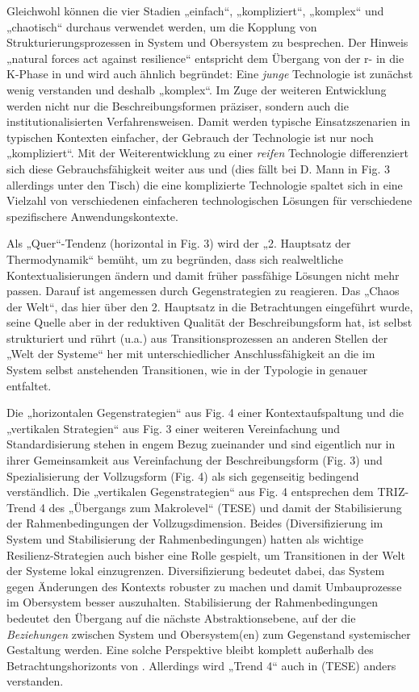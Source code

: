 \documentclass[11pt,a4paper]{article}
\begin{document}
Gleichwohl können die vier Stadien „einfach“, „kompliziert“, „komplex“ und
„chaotisch“ durchaus verwendet werden, um die Kopplung von
Strukturierungsprozessen in System und Obersystem zu besprechen. Der Hinweis
„natural forces act against resilience“ \cite[Fig. 3]{Mann2019} entspricht dem
Übergang von der r- in die K-Phase in \cite{Holling2000} und wird auch ähnlich
begründet: Eine \emph{junge} Technologie ist zunächst wenig verstanden und
deshalb „komplex“. Im Zuge der weiteren Entwicklung werden nicht nur die
Beschreibungsformen präziser, sondern auch die institutionalisierten
Verfahrensweisen. Damit werden typische Einsatzszenarien in typischen
Kontexten einfacher, der Gebrauch der Technologie ist nur noch „kompliziert“.
Mit der Weiterentwicklung zu einer \emph{reifen} Technologie differenziert
sich diese Gebrauchsfähigkeit weiter aus und (dies fällt bei D. Mann in Fig. 3
allerdings unter den Tisch) die eine komplizierte Technologie spaltet sich in
eine Vielzahl von verschiedenen einfacheren technologischen Lösungen für
verschiedene spezifischere Anwendungskontexte.

Als „Quer“-Tendenz (horizontal in Fig. 3) wird der „2. Hauptsatz der
Thermodynamik“ bemüht, um zu begründen, dass sich realweltliche
Kontextualisierungen ändern und damit früher passfähige Lösungen nicht mehr
passen.  Darauf ist angemessen durch Gegenstrategien \cite[Fig. 4]{Mann2019}
zu reagieren. Das „Chaos der Welt“, das hier über den 2. Hauptsatz in die
Betrachtungen eingeführt wurde, seine Quelle aber in der reduktiven Qualität
der Beschreibungsform hat, ist selbst strukturiert und rührt (u.a.) aus
Transitionsprozessen an anderen Stellen der „Welt der Systeme“ her mit
unterschiedlicher Anschlussfähigkeit an die im System selbst anstehenden
Transitionen, wie in der Typologie in \cite{Geels2007} genauer entfaltet.

Die „horizontalen Gegenstrategien“ aus Fig. 4 einer Kontextaufspaltung und die
„vertikalen Strategien“ aus Fig. 3 einer weiteren Vereinfachung und
Standardisierung stehen in engem Bezug zueinander und sind eigentlich nur in
ihrer Gemeinsamkeit aus Vereinfachung der Beschreibungsform (Fig. 3) und
Spezialisierung der Vollzugsform (Fig. 4) als sich gegenseitig bedingend
verständlich. Die „vertikalen Gegenstrategien“ aus Fig. 4 entsprechen dem
TRIZ-Trend 4 des „Übergangs zum Makrolevel“ (TESE) und damit der
Stabilisierung der Rahmenbedingungen der Vollzugsdimension. Beides
(Diversifizierung im System und Stabilisierung der Rahmenbedingungen) hatten
als wichtige Resilienz-Strategien auch bisher eine Rolle gespielt, um
Transitionen in der Welt der Systeme lokal einzugrenzen. Diversifizierung
bedeutet dabei, das System gegen Änderungen des Kontexts robuster zu machen
und damit Umbauprozesse im Obersystem besser auszuhalten. Stabilisierung der
Rahmenbedingungen bedeutet den Übergang auf die nächste Abstraktionsebene, auf
der die \emph{Beziehungen} zwischen System und Obersystem(en) zum Gegenstand
systemischer Gestaltung werden. Eine solche Perspektive bleibt komplett
außerhalb des Betrachtungshorizonts von \cite{Mann2019}. Allerdings wird
„Trend 4“ auch in (TESE) anders verstanden.
\end{document}
